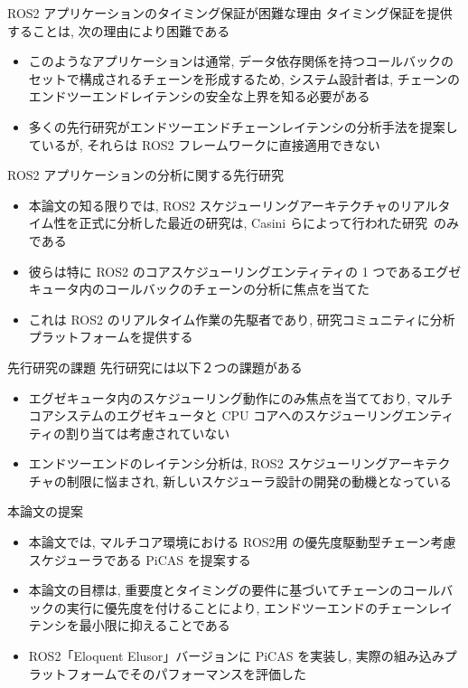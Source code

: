 \begin{frame}{ROS2 アプリケーションのタイミング保証が困難な理由}
    タイミング保証を提供することは, 次の理由により困難である
    \begin{itemize}
        \item このようなアプリケーションは通常, データ依存関係を持つコールバックのセットで構成されるチェーンを形成するため, システム設計者は, チェーンのエンドツーエンドレイテンシの安全な上界を知る必要がある
        \item 多くの先行研究がエンドツーエンドチェーンレイテンシの分析手法を提案しているが, それらは ROS2 フレームワークに直接適用できない
    \end{itemize}
\end{frame}

\begin{frame}{ROS2 アプリケーションの分析に関する先行研究}
    \begin{itemize}
        \item 本論文の知る限りでは, ROS2 スケジューリングアーキテクチャのリアルタイム性を正式に分析した最近の研究は, Casini らによって行われた研究~\cite{casini2019response}のみである
        \item 彼らは特に ROS2 のコアスケジューリングエンティティの 1 つであるエグゼキュータ内のコールバックのチェーンの分析に焦点を当てた
        \item これは ROS2 のリアルタイム作業の先駆者であり, 研究コミュニティに分析プラットフォームを提供する
    \end{itemize}
\end{frame}

\begin{frame}{先行研究の課題}
    先行研究には以下２つの課題がある
    \begin{itemize}
        \item エグゼキュータ内のスケジューリング動作にのみ焦点を当てており, マルチコアシステムのエグゼキュータと CPU コアへのスケジューリングエンティティの割り当ては考慮されていない
        \item エンドツーエンドのレイテンシ分析は, ROS2 スケジューリングアーキテクチャの制限に悩まされ, 新しいスケジューラ設計の開発の動機となっている
    \end{itemize}
\end{frame}

\begin{frame}{本論文の提案}
    \begin{itemize}
        \item 本論文では, マルチコア環境における ROS2用 の優先度駆動型チェーン考慮スケジューラである PiCAS を提案する
        \item 本論文の目標は, 重要度とタイミングの要件に基づいてチェーンのコールバックの実行に優先度を付けることにより, エンドツーエンドのチェーンレイテンシを最小限に抑えることである
        \item ROS2「Eloquent Elusor」バージョンに PiCAS を実装し, 実際の組み込みプラットフォームでそのパフォーマンスを評価した
    \end{itemize}
\end{frame}

